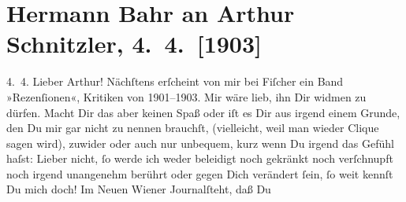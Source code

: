 

         
         \renewcommand{\erwaehntePersonen}{Personen: Rosa Bahr, Samuel Fischer, Olga Schnitzler}
         \renewcommand{\erwaehnteOrte}{Orte: Konservatorium der Gesellschaft der Musikfreunde, Wien}
         \renewcommand{\erwaehnteWerke}{Werke: Neues Wiener Journal, Rezensionen. Wiener Theater 1901 bis 1903}
               \section[Hermann Bahr an Arthur Schnitzler, 4. 4. {[}1903{]}]{ Hermann Bahr an Arthur Schnitzler, 4. 4. {[}1903{]}}\nopagebreak{}\rehead{ }\begin{ledgroupsized}[t]{13cm}\normalsize\beginnumbering \toendnotes[C]{\smallbreak\pagebreak[2]} 
\toendnotes[C]{\smallbreak}\pstart
           \raggedleft{}{\pb}4. 4.\pend
           \pstart\center{}Lieber Arthur!\pend\pstart
           Nächſtens erſcheint von mir bei Fiſcher ein
               Band »Rezenſionen«, Kritiken von 1901–1903. Mir
               wäre lieb, ihn Dir widmen zu dürfen. Macht Dir das aber keinen Spaß oder iſt es Dir
               aus irgend einem Grunde, den Du mir gar nicht zu nennen brauchſt, (vielleicht, weil
               man wieder Clique sagen wird), zuwider oder auch nur unbequem, kurz wenn Du irgend
               das Gefühl haſst: Lieber nicht, ſo werde ich weder beleidigt noch gekränkt noch
               verſchnupft noch irgend unangenehm berührt oder gegen Dich verändert ſein, ſo weit
               kennſt Du mich doch!{\pb}\pend
           \pstart
           Im Neuen Wiener Journalſteht, daß Du \label{K_L01286-1v}
\end{ledgroupsized}
